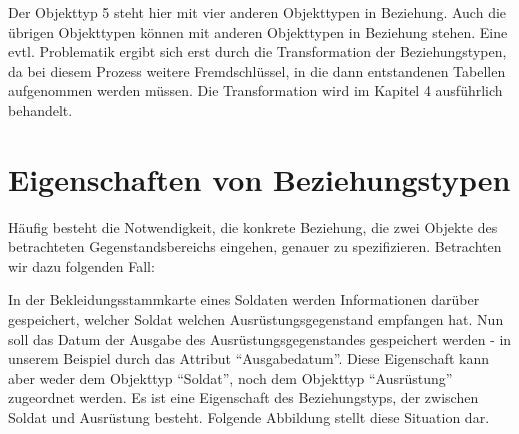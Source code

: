           \begin{center}
          \end{center}

        Der Objekttyp 5 steht hier mit vier anderen Objekttypen in Beziehung.
        Auch die \"ubrigen Objekttypen k\"onnen mit anderen Objekttypen in
        Beziehung stehen. Eine evtl. Problematik ergibt sich erst durch die
        Transformation der Beziehungstypen, da bei diesem Prozess weitere
        Fremdschl\"ussel, in die dann entstandenen Tabellen aufgenommen werden
        m\"ussen. Die Transformation wird im Kapitel 4 ausf\"uhrlich behandelt.
      \section{Eigenschaften von Beziehungstypen}
        \label{attributes_of_entities}
        H\"aufig besteht die Notwendigkeit, die konkrete Beziehung, die zwei
        Objekte des betrachteten Gegenstandsbereichs eingehen, genauer zu
        spezifizieren. Betrachten wir dazu folgenden Fall:

        In der Bekleidungsstammkarte eines Soldaten werden Informationen
        dar\"uber gespeichert, welcher Soldat welchen Ausr\"ustungsgegenstand
        empfangen hat. Nun soll das Datum der Ausgabe des
        Ausr\"ustungsgegenstandes gespeichert werden - in unserem Beispiel durch
        das Attribut \enquote{Ausgabedatum}. Diese Eigenschaft kann aber weder
        dem Objekttyp \enquote{Soldat}, noch dem Objekttyp
        \enquote{Ausr\"ustung} zugeordnet werden. Es ist eine Eigenschaft des
        Beziehungstyps, der zwischen Soldat und Ausr\"ustung besteht. Folgende
        Abbildung stellt diese Situation dar.

